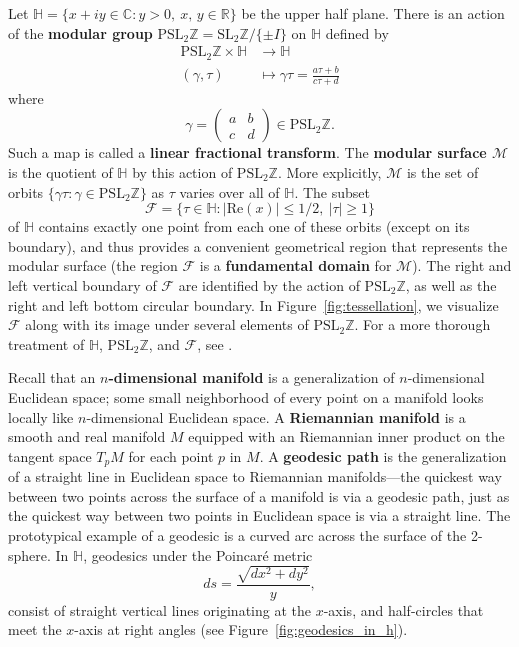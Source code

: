 \documentclass[12pt,twoside]{reedthesis}
\theoremstyle{definition}
\newcommand{\Z}{\mathbb{Z}}
\newcommand{\R}{\mathbb{R}}
\newcommand{\C}{\mathbb{C}}
\renewcommand{\H}{\mathbb{H}}
\newcommand{\SLZ}{\mathrm{SL}_2{\Z}}
\newcommand{\PSLZ}{\mathrm{PSL}_2{\Z}}
\newcommand{\defnphrase}[1]{\textbf{#1}}
\begin{document}
Let $\mathbb{H} = \{ x + i y \in \C : y > 0,\ x,\, y \in \R \}$ be the upper half plane.
There is an action of the \defnphrase{modular group} $\PSLZ = \SLZ / \{ \pm I \}$ on $\mathbb{H}$ defined by
\begin{align*}
  \PSLZ \times \mathbb{H} &\to \mathbb{H} \\
  (\gamma, \tau) &\mapsto \gamma\tau = \frac{a \tau + b}{c \tau + d}
\end{align*}
where
\begin{equation*}
  \gamma = \begin{pmatrix}
  a & b \\
  c & d
  \end{pmatrix} \in \PSLZ.
\end{equation*}
Such a map is called a \defnphrase{linear fractional transform}.
The \defnphrase{modular surface $\mathcal{M}$} is the quotient of $\mathbb{H}$ by this action of $\PSLZ$.
More explicitly, $\mathcal{M}$ is the set of orbits $\{ \gamma \tau : \gamma \in \PSLZ \}$ as $\tau$ varies over all of $\mathbb{H}$.
The subset
\begin{equation*}
  \mathcal{F} = \{ \tau \in \mathbb{H} : |\mathrm{Re}(x)| \leq 1/2,\ |\tau| \geq 1 \}
\end{equation*}
of $\mathbb{H}$ contains exactly one point from each one of these orbits (except on its boundary), and thus provides a convenient geometrical region that represents the modular surface (the region $\mathcal{F}$ is a \defnphrase{fundamental domain} for $\mathcal{M}$).
The right and left vertical boundary of $\mathcal{F}$ are identified by the action of $\PSLZ$, as well as the right and left bottom circular boundary.
In Figure~\ref{fig:tessellation}, we visualize $\mathcal{F}$ along with its image under several elements of $\PSLZ$.
For a more thorough treatment of $\mathbb{H}$, $\PSLZ$, and $\mathcal{F}$, see \cite{katok1992}.

Recall that an \defnphrase{$n$-dimensional manifold} is a generalization of $n$-dimensional Euclidean space; some small neighborhood of every point on a manifold looks locally like $n$-dimensional Euclidean space.
A \defnphrase{Riemannian manifold} is a smooth and real manifold $M$ equipped with an Riemannian inner product on the tangent space $T_pM$ for each point $p$ in $M$.
A \defnphrase{geodesic path} is the generalization of a straight line in Euclidean space to Riemannian manifolds---the quickest way between two points across the surface of a manifold is via a geodesic path, just as the quickest way between two points in Euclidean space is via a straight line.
The prototypical example of a geodesic is a curved arc across the surface of the 2-sphere.
In $\H$, geodesics under the Poincar\'e metric
\begin{equation*}
  ds = \frac{\sqrt{dx^2 + dy^2}}{y},
\end{equation*}
consist of straight vertical lines originating at the $x$-axis, and half-circles that meet the $x$-axis at right angles (see Figure~\ref{fig:geodesics_in_h}).
\end{document}
